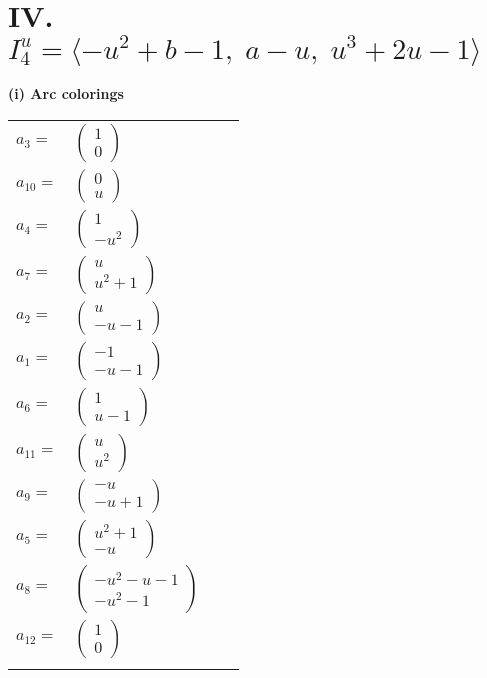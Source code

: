 \documentclass[1p]{elsarticle_modified}
\theoremstyle{definition}
\begin{document}
\centering \section*{IV. $I^u_{4}= \langle - u^2+b-1,\;a- u,\;u^3+2 u-1 \rangle$}
\flushleft \textbf{(i) Arc colorings}\\
\begin{tabular}{m{7pt} m{180pt} m{7pt} m{180pt} }
\flushright $a_{3}=$&$\begin{pmatrix}1\\0\end{pmatrix}$ \\
\flushright $a_{10}=$&$\begin{pmatrix}0\\u\end{pmatrix}$ \\
\flushright $a_{4}=$&$\begin{pmatrix}1\\- u^2\end{pmatrix}$ \\
\flushright $a_{7}=$&$\begin{pmatrix}u\\u^2+1\end{pmatrix}$ \\
\flushright $a_{2}=$&$\begin{pmatrix}u\\- u-1\end{pmatrix}$ \\
\flushright $a_{1}=$&$\begin{pmatrix}-1\\- u-1\end{pmatrix}$ \\
\flushright $a_{6}=$&$\begin{pmatrix}1\\u-1\end{pmatrix}$ \\
\flushright $a_{11}=$&$\begin{pmatrix}u\\u^2\end{pmatrix}$ \\
\flushright $a_{9}=$&$\begin{pmatrix}- u\\- u+1\end{pmatrix}$ \\
\flushright $a_{5}=$&$\begin{pmatrix}u^2+1\\- u\end{pmatrix}$ \\
\flushright $a_{8}=$&$\begin{pmatrix}- u^2- u-1\\- u^2-1\end{pmatrix}$ \\
\flushright $a_{12}=$&$\begin{pmatrix}1\\0\end{pmatrix}$\\&\end{tabular}
\end{document}
